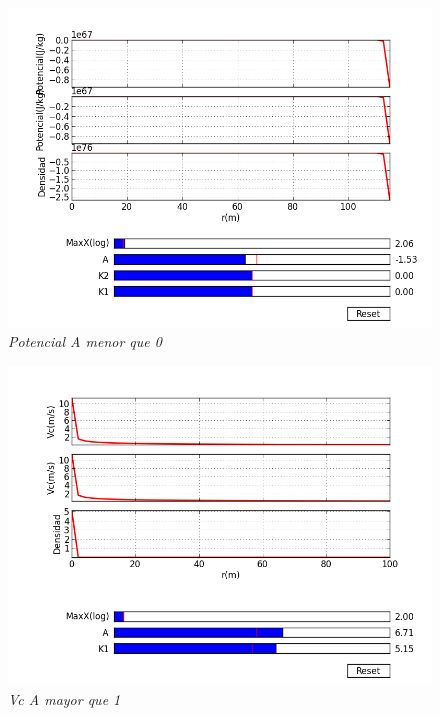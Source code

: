 \documentclass[12pt]{book}
\begin{document}
\begin{figure}[!h]
 \centering
 \includegraphics[scale=0.7]{potencial5.png}
 \caption{\emph{Potencial  A menor que 0}}
 \label{Fig: 1}
\end{figure}

\begin{figure}[!h]
 \centering
 \includegraphics[scale=0.7]{velocity4.png}
 \caption{\emph{Vc A mayor que 1}}
 \label{Fig: 1}
\end{figure}
\end{document}
